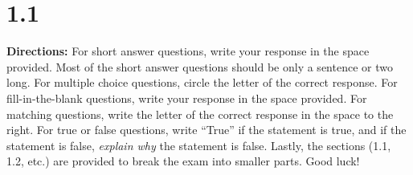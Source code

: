 \section*{1.1}

\textbf{Directions:} For short answer questions, write your response in the space provided. Most of the short answer questions should be only a sentence or two long. For multiple choice questions, circle the letter of the correct response. For fill-in-the-blank questions, write your response in the space provided. For matching questions, write the letter of the correct response in the space to the right. For true or false questions, write ``True'' if the statement is true, and if the statement is false, \textit{explain why} the statement is false. Lastly, the sections (1.1, 1.2, etc.) are provided to break the exam into smaller parts. Good luck!

